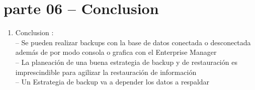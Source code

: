 \section{parte 06 – Conclusion} 

\begin{enumerate}[1.]
	\item Conclusion :
	\\-- Se pueden realizar backups con la base de datos conectada o desconectada además de por modo consola o grafica con el Enterprise Manager
	\\-- La planeación de una buena estrategia de backup y de restauración es imprescindible para agilizar la restauración de información
	\\-- Un Estrategia de backup va a depender los datos a respaldar


\end{enumerate} 

